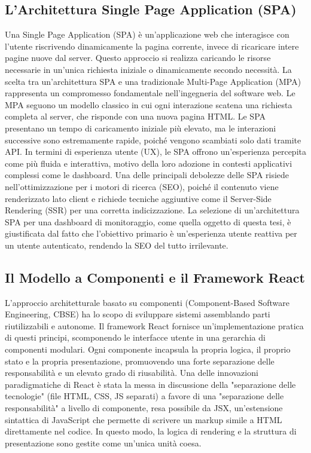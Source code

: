 \documentclass[12pt,a4paper,openright,twoside]{book}
\begin{document}
\subsection{L'Architettura Single Page Application (SPA)}
Una Single Page Application (SPA) è un'applicazione web che interagisce con l'utente riscrivendo dinamicamente la pagina corrente, invece di ricaricare intere pagine nuove dal server. Questo approccio si realizza caricando le risorse necessarie in un'unica richiesta iniziale o dinamicamente secondo necessità. La scelta tra un'architettura SPA e una tradizionale Multi-Page Application (MPA) rappresenta un compromesso fondamentale nell'ingegneria del software web. Le MPA seguono un modello classico in cui ogni interazione scatena una richiesta completa al server, che risponde con una nuova pagina HTML. Le SPA presentano un tempo di caricamento iniziale più elevato, ma le interazioni successive sono estremamente rapide, poiché vengono scambiati solo dati tramite API. In termini di esperienza utente (UX), le SPA offrono un'esperienza percepita come più fluida e interattiva, motivo della loro adozione in contesti applicativi complessi come le dashboard. Una delle principali debolezze delle SPA risiede nell'ottimizzazione per i motori di ricerca (SEO), poiché il contenuto viene renderizzato lato client e richiede tecniche aggiuntive come il Server-Side Rendering (SSR) per una corretta indicizzazione. La selezione di un'architettura SPA per una dashboard di monitoraggio, come quella oggetto di questa tesi, è giustificata dal fatto che l'obiettivo primario è un'esperienza utente reattiva per un utente autenticato, rendendo la SEO del tutto irrilevante.

\subsection{Il Modello a Componenti e il Framework React}
L'approccio architetturale basato su componenti (Component-Based Software Engineering, CBSE) ha lo scopo di sviluppare sistemi assemblando parti riutilizzabili e autonome. Il framework React fornisce un'implementazione pratica di questi principi, scomponendo le interfacce utente in una gerarchia di componenti modulari. Ogni componente incapsula la propria logica, il proprio stato e la propria presentazione, promuovendo una forte separazione delle responsabilità e un elevato grado di riusabilità. Una delle innovazioni paradigmatiche di React è stata la messa in discussione della "separazione delle tecnologie" (file HTML, CSS, JS separati) a favore di una "separazione delle responsabilità" a livello di componente, resa possibile da JSX, un'estensione sintattica di JavaScript che permette di scrivere un markup simile a HTML direttamente nel codice. In questo modo, la logica di rendering e la struttura di presentazione sono gestite come un'unica unità coesa.
\end{document}
